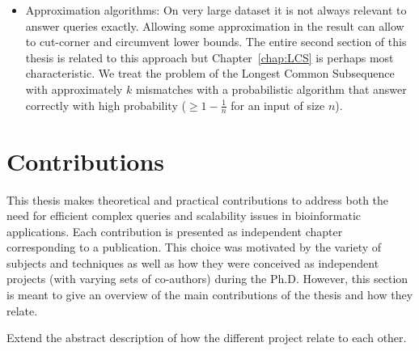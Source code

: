 \begin{itemize}
\item Approximation algorithms: On very large dataset it is not always relevant to answer queries exactly. Allowing some approximation in the result can allow to cut-corner and circumvent lower bounds. The entire second section of this thesis is related to this approach but Chapter~\ref{chap:LCS} is perhaps most characteristic. We treat the problem of the Longest Common Subsequence with approximately $k$ mismatches with a probabilistic algorithm that answer correctly with high probability ($\geq 1 - \frac{1}{n}$ for an input of size $n$).
\end{itemize}


\section{Contributions}\label{intro:sec:contrib}

This thesis makes theoretical and practical contributions to address both the need for efficient complex queries and scalability issues in bioinformatic applications. 
Each contribution is presented as independent chapter corresponding to a publication. This choice was motivated by the variety of subjects and techniques as well as how they were conceived as independent projects (with varying sets of co-authors) during the Ph.D. However, this section is meant to give an overview of the main contributions of the thesis and how they relate.

Extend the abstract description of how the different project relate to each other.
